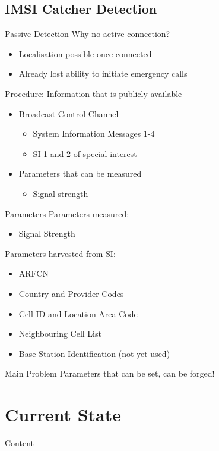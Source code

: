 \documentclass{beamer}
\newcommand{\tocsection}[1]{
  \section{#1}
  \begin{frame}{Content}
    \tableofcontents[sectionstyle=show/shaded,subsectionstyle=show/show/hide]
  \end{frame}
 }
\begin{document}
\subsection{IMSI Catcher Detection}
\begin{frame}{Passive Detection}
Why no active connection?
\begin{itemize}
	\item Localisation possible once connected
	\item Already lost ability to initiate emergency calls
\end{itemize}
\vspace{.8cm}
Procedure: Information that is publicly available
\begin{itemize}
	\item Broadcast Control Channel
	\begin{itemize}
		\item System Information Messages 1-4
		\item SI 1 and 2 of special interest
	\end{itemize}
	\item Parameters that can be measured
	\begin{itemize}
		\item Signal strength
	\end{itemize}
\end{itemize}
\end{frame}

\begin{frame}{Parameters}
Parameters measured:
\begin{itemize}
	\item Signal Strength
\end{itemize}
\vspace{.3cm}
Parameters harvested from SI:
\begin{itemize}
	\item ARFCN
	\item Country and Provider Codes
	\item Cell ID and Location Area Code
	\item Neighbouring Cell List
	\item Base Station Identification (not yet used)
\end{itemize}
\begin{alertblock}{Main Problem}
Parameters that can be set, can be forged!
\end{alertblock}
\end{frame}

\tocsection{Current State}
\end{document}
